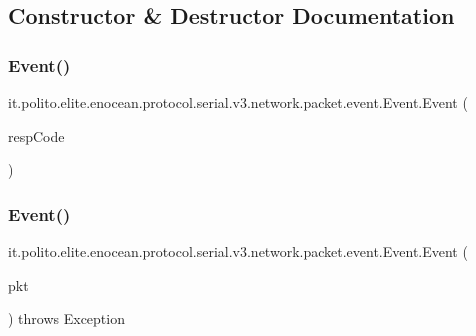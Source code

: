 \subsection{Constructor \& Destructor Documentation}
\hypertarget{classit_1_1polito_1_1elite_1_1enocean_1_1protocol_1_1serial_1_1v3_1_1network_1_1packet_1_1event_1_1_event_ad08f8f92c5d70d3845094df36ade589d}{}\label{classit_1_1polito_1_1elite_1_1enocean_1_1protocol_1_1serial_1_1v3_1_1network_1_1packet_1_1event_1_1_event_ad08f8f92c5d70d3845094df36ade589d} 
\subsubsection{\texorpdfstring{Event()}{Event()}\hspace{0.1cm}{\footnotesize\ttfamily [1/2]}}
{\footnotesize\ttfamily it.\+polito.\+elite.\+enocean.\+protocol.\+serial.\+v3.\+network.\+packet.\+event.\+Event.\+Event (\begin{DoxyParamCaption}\item[{byte}]{resp\+Code }\end{DoxyParamCaption})}

\hypertarget{classit_1_1polito_1_1elite_1_1enocean_1_1protocol_1_1serial_1_1v3_1_1network_1_1packet_1_1event_1_1_event_a9d71ddf55e76b024f18d7c5a553ae9f9}{}\label{classit_1_1polito_1_1elite_1_1enocean_1_1protocol_1_1serial_1_1v3_1_1network_1_1packet_1_1event_1_1_event_a9d71ddf55e76b024f18d7c5a553ae9f9} 
\subsubsection{\texorpdfstring{Event()}{Event()}\hspace{0.1cm}{\footnotesize\ttfamily [2/2]}}
{\footnotesize\ttfamily it.\+polito.\+elite.\+enocean.\+protocol.\+serial.\+v3.\+network.\+packet.\+event.\+Event.\+Event (\begin{DoxyParamCaption}\item[{\hyperlink{classit_1_1polito_1_1elite_1_1enocean_1_1protocol_1_1serial_1_1v3_1_1network_1_1packet_1_1_e_s_p3_packet}{E\+S\+P3\+Packet}}]{pkt }\end{DoxyParamCaption}) throws Exception}



